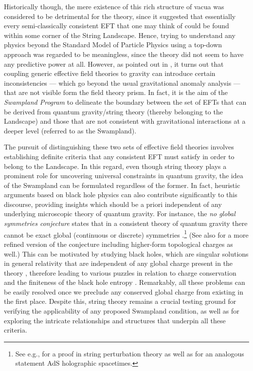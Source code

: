 Historically though, the mere existence of this rich structure of vacua was considered to be detrimental for the theory, since it suggested that essentially every semi-classically consistent EFT that one may think of could be found within some corner of the String Landscape. Hence, trying to understand any physics beyond the Standard Model of Particle Physics using a top-down approach was regarded to be meaningless, since the theory did not seem to have any predictive power at all. However, as pointed out in \cite{Vafa:2005ui}, it turns out that coupling generic effective field theories to gravity can introduce certain inconsistencies --- which go beyond the usual gravitational anomaly analysis \cite{Alvarez-Gaume:1983ihn} --- that are not visible form the field theory prism. In fact, it is the aim of the \emph{Swampland Program} \cite{Vafa:2005ui} to delineate the boundary between the set of EFTs that can be derived from quantum gravity/string theory (thereby belonging to the Landscape) and those that are not consistent with gravitational interactions at a deeper level (referred to as the Swampland). 

The pursuit of distinguishing these two sets of effective field theories involves establishing definite criteria that any consistent EFT must satisfy in order to belong to the Landscape. In this regard, even though string theory plays a prominent role for uncovering universal constraints in quantum gravity, the idea of the Swampland can be formulated regardless of the former. In fact, heuristic arguments based on black hole physics can also contribute significantly to this discourse, providing insights which should be a priori independent of any underlying microscopic theory of quantum gravity. For instance, the \emph{no global symmetries conjecture} states that in a consistent theory of quantum gravity there cannot be exact global (continuous or discrete) symmetries \cite{Israel:1967za,Zeldovich:1976vq,Kallosh:1995hi,Susskind:1995da,Banks:1988yz, Banks:2010zn,Yonekura:2020ino}.\footnote{See e.g., \cite{Polchinski:1998rr} for a proof in string perturbation theory as well as \cite{Harlow:2018jwu, Harlow:2018tng} for an analogous statement AdS holographic spacetimes.} (See also \cite{McNamara:2019rup} for a more refined version of the conjecture including higher-form topological charges as well.) This can be motivated by studying black holes, which are singular solutions in general relativity that are independent of any global charge present in the theory \cite{Israel:1967za}, therefore leading to various puzzles in relation to charge conservation and the finiteness of the black hole entropy \cite{Bekenstein:1972tm,Hawking:1975vcx}. Remarkably, all these problems can be easily resolved once we preclude any conserved global charge from existing in the first place. Despite this, string theory remains a crucial testing ground for verifying the applicability of any proposed Swampland condition, as well as for exploring the intricate relationships and structures that underpin all these criteria. 


